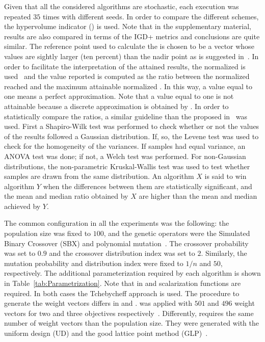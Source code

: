 Given that all the considered algorithms are stochastic, each execution was repeated $35$ times with different seeds.
%
In order to compare the different schemes, the hypervolume indicator (\HV{}) is used.
%
Note that in the supplementary material, results are also compared in terms of the IGD+ metrics and conclusions are quite similar.
%
The reference point used to calculate the \HV{} is chosen to be a vector whose values are sightly larger (ten percent) than the nadir point 
as is suggested in~\cite{ishibuchi2017reference}.
%
In order to facilitate the interpretation of the attained results, the normalized \HV{} is used~\cite{li2015evolutionary}
and the value reported is computed as the ratio between the normalized \HV{} reached and the maximum attainable 
normalized \HV{}.
%
In this way, a value equal to one means a perfect approximation.
%
Note that a value equal to one is not attainable because a discrete approximation is obtained by \MOEAS{}.
%
In order to statistically compare the \HV{} ratios, a similar guideline than the proposed in~\cite{Joel:StatisticalTest} was used. 
%
First a Shapiro-Wilk test was performed to check whether or not the values of the results followed a Gaussian distribution. 
%
If, so, the Levene test was used to check for the homogeneity of the variances. 
%
If samples had equal variance, an ANOVA test was done; if not, a Welch test was performed. 
%
For non-Gaussian distributions, the non-parametric Kruskal-Wallis test was used to test whether samples are drawn from the same distribution. 
%
An algorithm $X$ is said to win algorithm $Y$ when the differences between them are statistically significant, and the mean and median \HV{} ratio 
obtained by $X$ are higher than the mean and median achieved by $Y$.

%
The common configuration in all the experiments was the following: the population size was fixed to $100$, and the genetic operators were the Simulated Binary Crossover (SBX) and polynomial 
mutation~\cite{Joel:SBX1994, Joel:Mutation}.
%
The crossover probability was set to $0.9$ and the crossover distribution index was set to $2$.
%
Similarly, the mutation probability and distribution index were fixed to $1/n$ and $50$, respectively.
%
The additional parameterization required by each algorithm is shown in Table~\ref{tab:Parametrization}.
%
Note that in \MOEAD{} and \RMOEA{} scalarization functions are required.
%
In both cases the Tchebycheff approach is used.
%
The procedure to generate the weight vectors differs in \MOEAD{} and \RMOEA{}.
%
\RMOEA{} was applied with $501$ and $496$ weight vectors for two and three objectives respectively~\cite{trautmann2013r2}.
%
Differently, \MOEAD{} requires the same number of weight vectors than the population size.
%
They were generated with the uniform design (UD) and the good lattice point method (GLP)~\cite{Joel:MOEAD_Uniform_Design, Joel:Kuhn_Munkres}.

